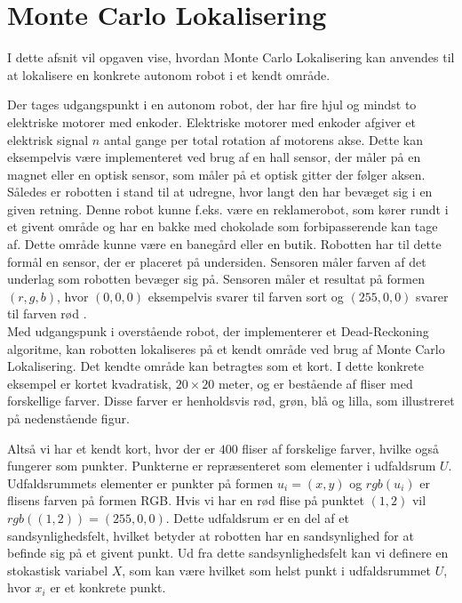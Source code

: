 \documentclass[../../SRP.tex]{subfiles}
\begin{document}
\chapter{Monte Carlo Lokalisering}
I dette afsnit vil opgaven vise, hvordan Monte Carlo Lokalisering kan anvendes til at lokalisere en konkrete autonom robot i et kendt område.

 Der tages udgangspunkt i en autonom robot, der har fire hjul og mindst to elektriske motorer med enkoder. Elektriske motorer med enkoder afgiver et elektrisk signal $n$ antal gange per total rotation af motorens akse. Dette kan eksempelvis være implementeret ved brug af en hall sensor, der måler på en magnet eller en optisk sensor, som måler på et optisk gitter der følger aksen. Således er robotten i stand til at udregne, hvor langt den har bevæget sig i en given retning. Denne robot kunne f.eks. være en reklamerobot, som kører rundt i et givent område og har en bakke med chokolade som forbipasserende kan tage af. Dette område kunne være en banegård eller en butik. Robotten har til dette formål en sensor, der er placeret på undersiden. Sensoren måler farven af det underlag som robotten bevæger sig på. Sensoren måler et resultat på formen $(r,g,b)$, hvor $(0,0,0)$ eksempelvis svarer til farven sort og $(255,0,0)$ svarer til farven rød \cite{DR}. \\

Med udgangspunk i overstående robot, der implementerer et Dead-Reckoning algoritme, kan robotten lokaliseres på et kendt område ved brug af Monte Carlo Lokalisering. Det kendte område kan betragtes som et kort. I dette konkrete eksempel er kortet kvadratisk, $20 \times 20$ meter, og er bestående af fliser med forskellige farver. Disse farver er henholdsvis rød, grøn, blå og lilla, som illustreret på nedenstående figur.


\begin{center}
\end{center}

Altså vi har et kendt kort, hvor der er $400$ fliser af forskelige farver, hvilke også fungerer som punkter. Punkterne er repræsenteret som elementer i udfaldsrum $U$. Udfaldsrummets elementer er punkter på formen $u_i = (x,y)$ og $rgb(u_i)$ er flisens farven på formen RGB. Hvis vi har en rød flise på punktet $(1,2)$ vil $rgb((1,2)) = (255,0,0)$. Dette udfaldsrum er en del af et sandsynlighedsfelt, hvilket betyder at robotten har en sandsynlighed for at befinde sig på et givent punkt. Ud fra dette sandsynlighedsfelt kan vi definere en stokastisk variabel $X$, som kan være hvilket som helst punkt i udfaldsrummet $U$, hvor $x_i$ er et konkrete punkt.
\end{document}
